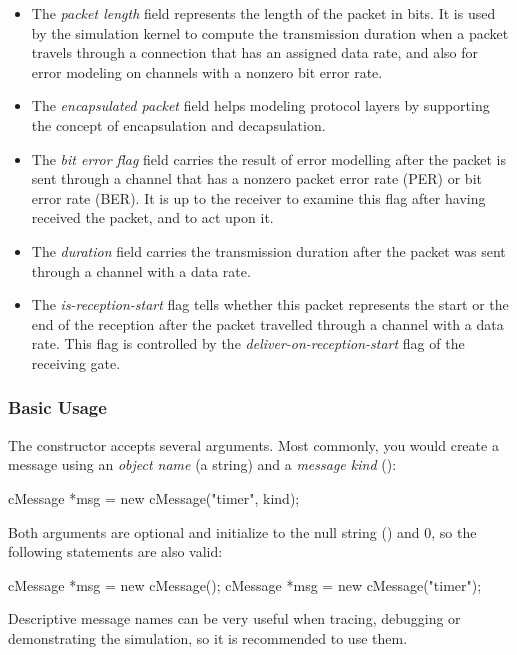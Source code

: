 \begin{itemize}
  \item The \textit{packet length} field represents the length of the packet
    in bits. It is used by the simulation kernel to compute the transmission
    duration when a packet travels through a connection that has an assigned
    data rate, and also for error modeling on channels with a nonzero
    bit error rate.
  \item The \textit{encapsulated packet} field helps modeling protocol layers
    by supporting the concept of encapsulation and decapsulation.
  \item The \textit{bit error flag} field carries the result of error
    modelling after the packet is sent through a channel that has a nonzero
    packet error rate (PER) or bit error rate (BER). It is up to the receiver
    to examine this flag after having received the packet, and to act upon it.
  \item The \textit{duration} field carries the transmission duration after
    the packet was sent through a channel with a data rate.
  \item The \textit{is-reception-start} flag tells whether this packet
    represents the start or the end of the reception after the packet travelled
    through a channel with a data rate. This flag is controlled by the
    \textit{deliver-on-reception-start} flag of the receiving gate.
\end{itemize}


\subsubsection{Basic Usage}


The  constructor accepts several arguments.
Most commonly, you would create a message using an \textit{object name}
(a  string) and a \textit{message kind} ():

\begin{cpp}
cMessage *msg = new cMessage("timer", kind);
\end{cpp}

Both arguments are optional and initialize to the null string ()
and 0, so the following statements are also valid:

\begin{cpp}
cMessage *msg = new cMessage();
cMessage *msg = new cMessage("timer");
\end{cpp}

Descriptive message names can be very useful when tracing, debugging or
demonstrating the simulation, so it is recommended to use them.

